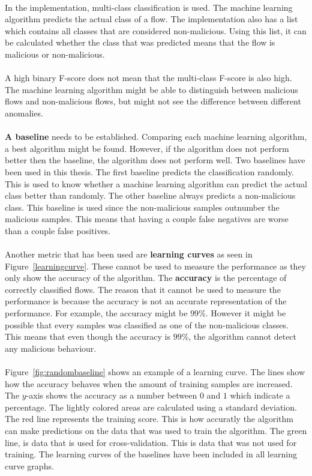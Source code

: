 \\
In the implementation, multi-class classification is used. The machine learning algorithm predicts the actual class of a flow. The implementation also has a list which contains all classes that are considered non-malicious. Using this list, it can be calculated whether the class that was predicted means that the flow is malicious or non-malicious. \\
\\ 
A high binary F-score does not mean that the multi-class F-score is also high. The machine learning algorithm might be able to distinguish between malicious flows and non-malicious flows, but might not see the difference between different anomalies.\\
\\
\textbf{A baseline} needs to be established. Comparing each machine learning algorithm, a best algorithm might be found. However, if the algorithm does not perform better then the baseline, the algorithm does not perform well. Two baselines have been used in this thesis. The first baseline predicts the classification randomly. This is used to know whether a machine learning algorithm can predict the actual class better than randomly. The other baseline always predicts a non-malicious class. This baseline is used since the non-malicious samples outnumber the malicious samples. This means that having a couple false negatives are worse than a couple false positives. \\
\\
Another metric that has been used are \textbf{learning curves} as seen in Figure~\ref{learningcurve}. These cannot be used to measure the performance as they only show the accuracy of the algorithm. The \textbf{accuracy} is the percentage of correctly classified flows. The reason that it cannot be used to measure the performance is because the accuracy is not an accurate representation of the performance. For example, the accuracy might be $99$\%. However it might be possible that every samples was classified as one of the non-malicious classes. This means that even though the accuracy is $99$\%, the algorithm cannot detect any malicious behaviour.\\
\\
Figure~\ref{fig:randombaseline} shows an example of a learning curve. The lines show how the accuracy behaves when the amount of training samples are increased. The $y$-axis shows the accuracy as a number between $0$ and $1$ which indicate a percentage. The lightly colored areas are calculated using a standard deviation. The red line represents the training score. This is how accuratly the algorithm can make predictions on the data that was used to train the algorithm. The green line, is data that is used for cross-validation. This is data that was not used for training. The learning curves of the baselines have been included in all learning curve graphs.


